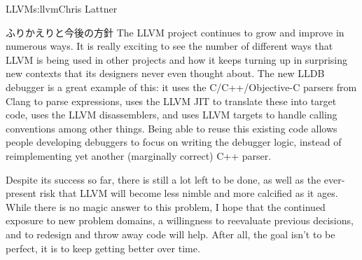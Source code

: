 \begin{aosachapter}{LLVM}{s:llvm}{Chris Lattner}
\begin{aosasect1}{ふりかえりと今後の方針}
The LLVM project continues to grow and improve in numerous ways.  It
is really exciting to see the number of different ways that LLVM is
being used in other projects and how it keeps turning up in surprising
new contexts that its designers never even thought about.  The new
LLDB debugger is a great example of this: it uses the
C/C++/Objective-C parsers from Clang to parse expressions, uses the
LLVM JIT to translate these into target code, uses the LLVM
disassemblers, and uses LLVM targets to handle calling conventions
among other things.  Being able to reuse this existing code allows
people developing debuggers to focus on writing the debugger logic, instead of
reimplementing yet another (marginally correct) C++ parser.

Despite its success so far, there is still a lot left to be done, as
well as the ever-present risk that LLVM will become less nimble and
more calcified as it ages.  While there is no magic answer to this
problem, I hope that the continued exposure to new problem domains, a
willingness to reevaluate previous decisions, and to
redesign and throw away code will help.  After all, the goal isn't to
be perfect, it is to keep getting better over time.

\end{aosasect1}

\end{aosachapter}
